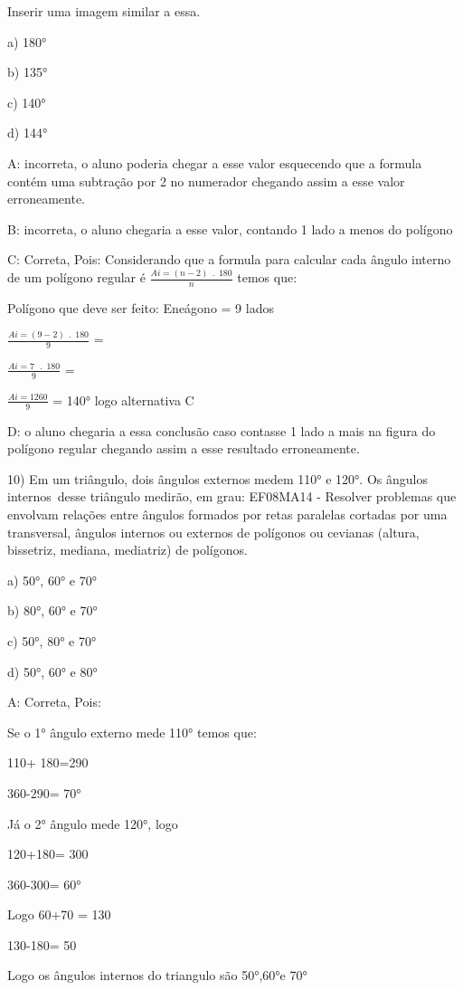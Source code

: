 {Inserir uma imagem similar a essa.

a) 180°

b) 135°

c) 140°

d) 144°

A: incorreta, o aluno poderia chegar a esse valor esquecendo que a
formula contém uma subtração por 2 no numerador chegando assim a esse
valor erroneamente.

B: incorreta, o aluno chegaria a esse valor, contando 1 lado a menos do
polígono

C: Correta, Pois: Considerando que a formula para calcular cada ângulo
interno de um polígono regular é
\(\frac{Ai = \left( n - 2 \right)\ \ .\ \ 180}{n}\) temos que:

Polígono que deve ser feito: Eneágono = 9 lados

\(\frac{Ai = \left( 9 - 2 \right)\ \ .\ \ 180}{9}\) =

\(\frac{Ai = 7\ \ \ .\ \ 180}{9}\) =

\(\frac{Ai = 1260}{9}\) = 140° logo alternativa C

D: o aluno chegaria a essa conclusão caso contasse 1 lado a mais na
figura do polígono regular chegando assim a esse resultado erroneamente.

10) Em um triângulo, dois ângulos externos medem 110° e 120°. Os ângulos
internos~desse triângulo medirão, em grau: EF08MA14 - Resolver problemas
que envolvam relações entre ângulos formados por retas paralelas
cortadas por uma transversal, ângulos internos ou externos de polígonos
ou cevianas (altura, bissetriz, mediana, mediatriz) de polígonos.

a) 50°, 60° e 70°

b) 80°, 60° e 70°

c) 50°, 80° e 70°

d) 50°, 60° e 80°

A: Correta, Pois:

Se o 1° ângulo externo mede 110° temos que:

110+ 180=290

360-290= 70°

Já o 2° ângulo mede 120°, logo

120+180= 300

360-300= 60°

Logo 60+70 = 130

130-180= 50

Logo os ângulos internos do triangulo são 50°,60°e 70°

}
